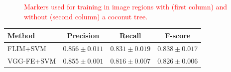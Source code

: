 \documentclass[journal, twoside]{IEEEtran}
\begin{document}
{\begin{figure}[!t]
    \centering
    ~
    \\
    ~
    \caption{\textcolor{red}{Markers used for training in image regions with (first column) and without (second column) a coconut tree.}}
    \label{fig:markers}
\end{figure}

\begin{table}[!t]
  \begin{center}
  \begin{tabular}{|l|c|c|c|}
  \hline
   Method & Precision & Recall & F-score \\
  \hline\hline
    FLIM+SVM & $0.856 \pm 0.011 $ & $ 0.831 \pm 0.019$ & $ 0.838 \pm 0.017$\\ 
    VGG-FE+SVM & $0.855 \pm 0.001$ & $0.816 \pm 0.007$ & $0.826 \pm 0.006 $ \\\hline
      

\end{tabular}
\end{center}
\end{table}}
\end{document}
